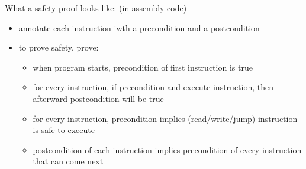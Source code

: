 What a safety proof looks like: (in assembly code)
\begin{itemize}
    \item annotate each instruction iwth a precondition and a postcondition
    \item to prove safety, prove:
        \begin{itemize}
            \item when program starts, precondition of first instruction is true
            \item for every instruction, if precondition and execute
                instruction, then afterward postcondition will be true
            \item for every instruction, precondition implies (read/write/jump)
                instruction is safe to execute
            \item postcondition of each instruction implies precondition of
                every instruction that can come next
        \end{itemize}
\end{itemize}
